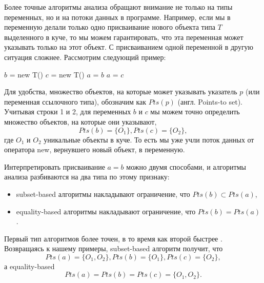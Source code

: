 \documentclass[a4,14pt,titlepage]{extarticle}
\newcommand{\eng}[1]{{\English#1}}
\begin{document}
    Более точные алгоритмы анализа обращают внимание не только на типы
    переменных, но и на потоки данных в программе. Например, если мы в
    переменную делали только одно присваивание нового объекта типа $T$
    выделенного в куче, то мы можем гарантировать, что эта переменная может
    указывать только на этот объект.  С присваиванием одной переменной в другую
    ситуация сложнее.
    Рассмотрим следующий пример:
    \begin{algorithmic}[1]
    \STATE $b$ = new T()
    \STATE $c$ = new T()
    \STATE $a$ = $b$
    \STATE $a$ = $c$
    \end{algorithmic}
    Для удобства, множество объектов, на которые может указывать указатель $p$
    (или переменная ссылочного типа), обозначим как $Pts(p)$
    (англ. \eng{Points-to set}).
    Учитывая строки 1 и 2, для переменных $b$ и $c$ мы можем точно определить
    множество объектов, на которые они указывают,
    \[Pts(b) = \{O_1\}, Pts(c) = \{O_2\},\] где $O_1$ и $O_2$ уникальные
    объекты в куче. То есть мы уже учли поток данных от оператора new,
    вернувшего новый объект, в переменную.

    Интерпретировать присваивание $a = b$ можно двумя способами,
    и алгоритмы анализа разбиваются на два типа по этому признаку:
    \begin{itemize}
      \item \eng{subset-based} алгоритмы накладывают ограничение, что
            $Pts(b) \subset Pts(a)$,
      \item \eng{equality-based} алгоритмы накладывают ограничение, что
            $Pts(b) = Pts(a)$.
    \end{itemize}
    Первый тип алгоритмов более точен, в то время как второй быстрее
    \cite{steensgaard}. Возвращаясь к нашему примеры, \eng{subset-based}
    алгоритм получит, что
    \[Pts(a) = \{O_1, O_2\}, Pts(b) = \{O_1\}, Pts(c) = \{O_2\},\]
    а \eng{equality-based}
    \[Pts(a) = Pts(b) = Pts(c) = \{O_1, O_2\}.\]
\end{document}
